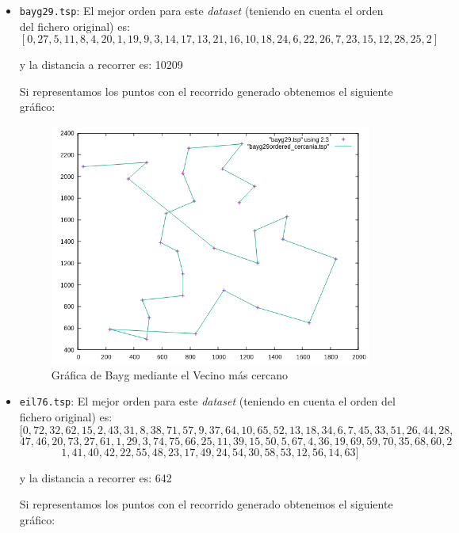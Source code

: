 \documentclass[10pt,a4paper]{article}
\begin{document}
\begin{itemize}
	\item \texttt{bayg29.tsp}: El mejor orden para este \textit{dataset} (teniendo en cuenta el orden del fichero original) es:
	\[
		[0,27,5,11,8,4,20,1,19,9,3,14,17,13,21,16,10,18,24,6,22,26,7,23,15,12,28,25,2]
	\]
	
	y la distancia a recorrer es: 10209
	
	Si representamos los puntos con el recorrido generado obtenemos el siguiente gráfico:
	
	\begin{figure}[h!]
	\centering
	\includegraphics[scale=0.5]{./Images/bayg_cercania.png}
	\caption{Gráfica de Bayg mediante el Vecino más cercano}
	\end{figure}
	
	\item \texttt{eil76.tsp}: El mejor orden para este \textit{dataset} (teniendo en cuenta el orden del fichero original) es:
	\[
		[0,72,32,62,15,2,43,31,8,38,71,57,9,37,64,10,65,52,13,18,34,6,7,45,33,51,26,44,28,
	\]
	\[
		47,46,20,73, 27, 61,1,29,3,74,75,66,25,11,39,15,50,5,67,4,36,19,69,59,70,35,68,60,2
	\]
	\[
		1,41,40,42,22,55,48,23,17,49,24,54,30,58,53,12,56,14,63]
	\]
	
	y la distancia a recorrer es: 642
	
	Si representamos los puntos con el recorrido generado obtenemos el siguiente gráfico:
	

\end{itemize}
\end{document}
